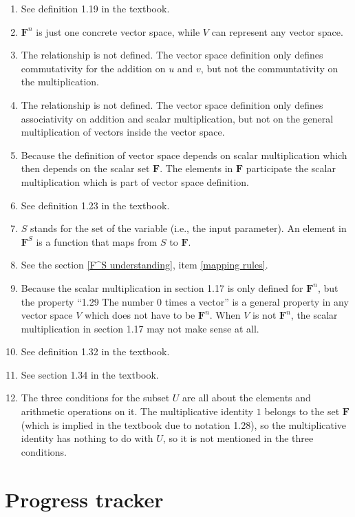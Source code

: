 \documentclass[12pt, letterpaper, oneside]{book}
\begin{document}
\begin{enumerate}
  \item See definition 1.19 in the textbook.
  \item $\mathbf{F}^n$ is just one concrete vector space, while $V$ can
    represent any vector space.
  \item The relationship is not defined. The vector space definition only
    defines commutativity for the addition on $u$ and $v$, but not the
    communtativity on the multiplication.
  \item The relationship is not defined. The vector space definition only
    defines associativity on addition and scalar multiplication, but not on
    the general multiplication of vectors inside the vector space.
  \item Because the definition of vector space depends on scalar multiplication
    which then depends on the scalar set $\mathbf{F}$. The elements in
    $\mathbf{F}$ participate the scalar multiplication which is part of vector
    space definition.
  \item See definition 1.23 in the textbook.
  \item $S$ stands for the set of the variable (i.e., the input parameter). An
    element in $\mathbf{F}^S$ is a function that maps from $S$ to $\mathbf{F}$.
  \item See the section \ref{F^S understanding}, item \ref{mapping rules}.
    \item Because the scalar multiplication in section 1.17 is only defined for
    $\mathbf{F}^n$, but the property ``1.29 The number 0 times a vector'' is a
    general property in any vector space $V$ which does not have to be
    $\mathbf{F}^n$. When $V$ is not $\mathbf{F}^n$, the scalar multiplication
    in section 1.17 may not make sense at all.
  \item See definition 1.32 in the textbook.
  \item See section 1.34 in the textbook.
  \item The three conditions for the subset $U$ are all about the elements and
    arithmetic operations on it. The multiplicative identity $1$ belongs to the
    set $\mathbf{F}$ (which is implied in the textbook due to notation 1.28),
    so the multiplicative identity has nothing to do with $U$, so it is not
    mentioned in the three conditions.
 \end{enumerate}

\section{Progress tracker}
\end{document}

